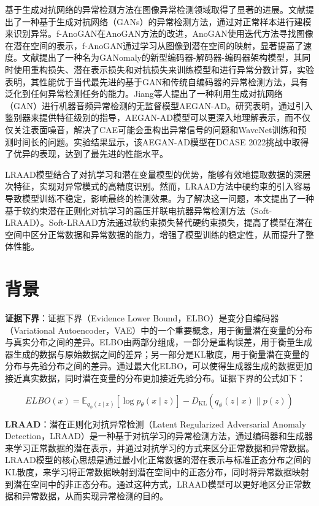 \documentclass{article}
\begin{document}
基于生成对抗网络的异常检测方法在图像异常检测领域取得了显著的进展。文献\cite{anogan}提出了一种基于生成对抗网络（GANs）的异常检测方法，通过对正常样本进行建模来识别异常。f-AnoGAN\cite{f-anogan}在AnoGAN\cite{anogan}方法的改进，AnoGAN使用迭代方法寻找图像在潜在空间的表示，f-AnoGAN通过学习从图像到潜在空间的映射，显著提高了速度。文献\cite{ganomaly}提出了一种名为GANomaly的新型编码器-解码器-编码器架构模型，其同时使用重构损失、潜在表示损失和对抗损失来训练模型和进行异常分数计算，实验表明，其性能优于当代最先进的基于GAN和传统自编码器的异常检测方法，具有泛化到任何异常检测任务的能力。Jiang等人\cite{AEGAN-AD}提出了一种利用生成对抗网络（GAN）进行机器音频异常检测的无监督模型AEGAN-AD。研究表明，通过引入鉴别器来提供特征级别的指导，AEGAN-AD模型可以更深入地理解表示，而不仅仅关注表面噪音，解决了CAE可能会重构出异常信号的问题和WaveNet训练和预测时间长的问题。实验结果显示，该AEGAN-AD模型在DCASE 2022挑战中取得了优异的表现，达到了最先进的性能水平。

LRAAD模型结合了对抗学习和潜在变量模型的优势，能够有效地提取数据的深层次特征，实现对异常模式的高精度识别。然而，LRAAD方法中硬约束的引入容易导致模型训练不稳定，影响最终的检测效果。为了解决这一问题，本文提出了一种基于软约束潜在正则化对抗学习的高压并联电抗器异常检测方法（Soft-LRAAD）。Soft-LRAAD方法通过软约束损失替代硬约束损失，提高了模型在潜在空间中区分正常数据和异常数据的能力，增强了模型训练的稳定性，从而提升了整体性能。

\section{背景}

\textbf{证据下界}：证据下界（Evidence Lower Bound，ELBO）是变分自编码器（Variational Autoencoder，VAE）中的一个重要概念，用于衡量潜在变量的分布与真实分布之间的差异。ELBO由两部分组成，一部分是重构误差，用于衡量生成器生成的数据与原始数据之间的差异；另一部分是KL散度，用于衡量潜在变量的分布与先验分布之间的差异。通过最大化ELBO，可以使得生成器生成的数据更加接近真实数据，同时潜在变量的分布更加接近先验分布。证据下界的公式如下：

\begin{equation}
  ELBO(x)=\mathbb{E}_{q_{\phi}(z \mid x)}[\log p_{\theta}(x \mid z)]-D_{\mathrm{KL}}\left(q_{\phi}(z \mid x) \| p(z)\right) 
\end{equation}

\textbf{LRAAD}：潜在正则化对抗异常检测（Latent Regularized Adversarial Anomaly Detection，LRAAD）是一种基于对抗学习的异常检测方法，通过编码器和生成器来学习正常数据的潜在表示，并通过对抗学习的方式来区分正常数据和异常数据。LRAAD模型的核心思想是通过最小化正常数据的潜在表示与标准正态分布之间的KL散度，来学习将正常数据映射到潜在空间中的正态分布，同时将异常数据映射到潜在空间中的非正态分布。通过这种方式，LRAAD模型可以更好地区分正常数据和异常数据，从而实现异常检测的目的。
\end{document}
